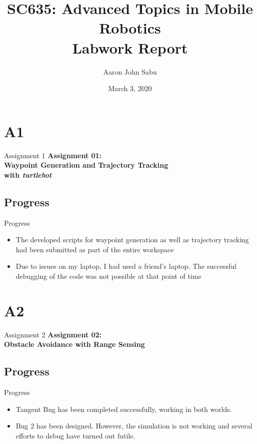 \documentclass{beamer}
\title[SC 635 Labwork]{SC635: Advanced Topics in Mobile Robotics\\Labwork Report}
\author{Aaron John  Sabu}
\institute{170070050\\ Department of Electrical Engineering\\ IIT Bombay}
\date{March 3, 2020}
\begin{document}
\maketitle

\section{A1}

\begin{frame}{Assignment 1}
  \centering
  \textbf{Assignment 01:\\Waypoint Generation and Trajectory Tracking\\ with \textit{turtlebot}}
\end{frame}


\subsection{Progress}
\begin{frame}{Progress}
\begin{itemize}
    \item The developed scripts for waypoint generation as well as trajectory tracking had been submitted as part of the entire workspace
    \item Due to issues on my laptop, I had used a friend's laptop. The successful debugging of the code was not possible at that point of time
\end{itemize}
\end{frame}

\section{A2}

\begin{frame}{Assignment 2}
  \centering
  \textbf{Assignment 02:\\Obstacle Avoidance with Range Sensing}
\end{frame}

\subsection{Progress}
\begin{frame}{Progress}
\begin{itemize}
    \item Tangent Bug has been completed successfully, working in both worlds.
    \item Bug 2 has been designed. However, the simulation is not working and several efforts to debug have turned out futile.
\end{itemize}
\end{frame}
\end{document}
